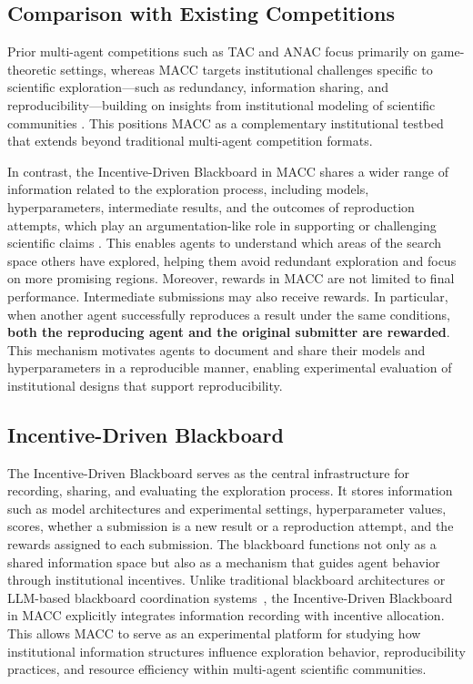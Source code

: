 \documentclass[sigconf]{aamas}
\begin{document}
\subsection{Comparison with Existing Competitions}

Prior multi-agent competitions such as TAC \cite{Wellman:TAC:2001}
and ANAC \cite{Jonker:ANAC:2017} focus primarily on game-theoretic
settings, whereas MACC targets institutional challenges specific to
scientific exploration---such as redundancy, information sharing, and
reproducibility---building on insights from institutional modeling of
scientific communities \cite{oconnor2023modelling}. This positions MACC as a
complementary institutional testbed that extends beyond traditional
multi-agent competition formats.

In contrast, the Incentive-Driven Blackboard in MACC shares a wider range of information related to the exploration process, including models, hyperparameters, intermediate results, and the outcomes of reproduction attempts, which play an argumentation-like role in supporting or challenging scientific claims \cite{carrera2015argumentationmas}.
This
enables agents to understand which areas of the search space others have
explored, helping them avoid redundant exploration and focus on more
promising regions.
Moreover, rewards in MACC are not limited to final performance.
Intermediate submissions may also receive rewards. In particular, when
another agent successfully reproduces a result under the same
conditions, \textbf{both the reproducing agent and the original
submitter are rewarded}. This mechanism motivates agents to document
and share their models and hyperparameters in a reproducible manner,
enabling experimental evaluation of institutional designs that support
reproducibility.

\subsection{Incentive-Driven Blackboard}

The Incentive-Driven Blackboard serves as the central infrastructure for recording, sharing, and evaluating the exploration process.
It stores information such as model architectures and
experimental settings, hyperparameter values, scores, whether a
submission is a new result or a reproduction attempt, and the rewards
assigned to each submission. The blackboard functions not only as a
shared information space but also as a mechanism that guides agent
behavior through institutional incentives.
Unlike traditional blackboard architectures \cite{HayesRoth1985Blackboard}
or LLM-based blackboard coordination systems~\cite{Salemi2025LLMBlackboard},
the Incentive-Driven Blackboard in MACC explicitly integrates information
recording with incentive allocation. 
This allows MACC to serve as an
experimental platform for studying how institutional information
structures influence exploration behavior, reproducibility practices, and
resource efficiency within multi-agent scientific communities.
\end{document}
